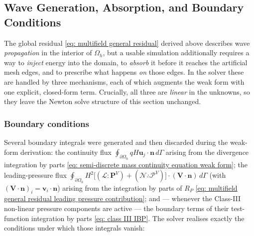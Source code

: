 \documentclass{article}
\newcommand{\uj}{\mathbf{u}_j}
\newcommand{\VmP}{\mathbf{P}^V}
\newcommand{\VtP}{\boldsymbol{\mathcal{P}}^V}
\newcommand{\vi}{\mathbf{v}_i}
\newcommand{\Oh}{\Omega_h}
\newcommand{\VL}{\boldsymbol{\mathcal{L}}}
\newcommand{\VN}{\boldsymbol{\mathcal{N}}}
\begin{document}
\subsection*{Wave Generation, Absorption, and Boundary Conditions}

The global residual \eqref{eq: multifield general residual} derived above describes wave
\emph{propagation} in the interior of $\Oh$, but a usable simulation additionally requires a way to
\emph{inject} energy into the domain, to \emph{absorb} it before it reaches the artificial mesh
edges, and to prescribe what happens \emph{on} those edges. In the solver these are handled by three
mechanisms, each of which augments the weak form with one explicit, closed-form term. Crucially, all
three are \emph{linear} in the unknowns, so they leave the Newton solve structure of
this section unchanged.

\subsubsection*{Boundary conditions}

Several boundary integrals were generated and then discarded during the weak-form derivation: the
continuity flux $\oint_{\partial\Oh} q H\uj\cdot\mathbf{n}\,d\Gamma$ arising from the divergence
integration by parts \eqref{eq: semi-discrete mass continuity equation weak form}; the
leading-pressure flux
$\oint_{\partial\Oh} H^2\big[(\VL:\VmP)+(\VN\therefore\VtP)\big]\cdot(\mathbf{V}\cdot\mathbf{n})\,d\Gamma$
(with $(\mathbf{V}\cdot\mathbf{n})_i = \vi\cdot\mathbf{n}$) arising from the integration by parts of
$R_P$ \eqref{eq: multifield general residual leading pressure contribution}; and — whenever the
Class-III non-linear pressure components are active — the boundary terms of their test-function
integration by parts \eqref{eq: class III IBP}. The
solver realises exactly the conditions under which those integrals vanish:
\end{document}
